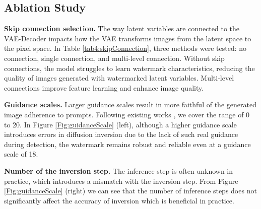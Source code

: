 \subsection{Ablation Study}






\noindent\textbf{Skip connection selection.}
The way latent variables are connected to the VAE-Decoder impacts how the VAE transforms images from the latent space to the pixel space. In Table \ref{tab4:skipConnection}, three methods were tested: no connection, single connection, and multi-level connection. Without skip connections, the model struggles to learn watermark characteristics, reducing the quality of images generated with watermarked latent variables. Multi-level connections improve feature learning and enhance image quality.

\noindent\textbf{Guidance scales.} Larger guidance scales result in more faithful of the generated image adherence to prompts. Following existing works \cite{wen2024tree}, we
cover the range of 0 to 20.  In
Figure \ref{Fig:guidanceScale} (left), although a higher guidance scale introduces errors in diffusion inversion due to the lack of such real guidance during detection, the watermark remains robust and reliable even at a guidance scale of 18.

\noindent\textbf{Number of the inversion step.} The inference step is often unknown in practice, which introduces a mismatch with
the inversion step. From Figure \ref{Fig:guidanceScale} (right) we can see that the number of inference steps does not significantly affect the accuracy of inversion which is beneficial in practice.

























